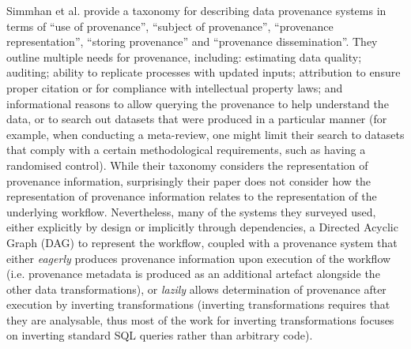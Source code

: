 Simmhan et al. \cite{Simmhan2005} provide a taxonomy for describing data provenance systems in terms of ``use of provenance'', ``subject of provenance'', ``provenance representation'', ``storing provenance'' and ``provenance dissemination''. They outline multiple needs for provenance, including: estimating data quality; auditing; ability to replicate processes with updated inputs; attribution to ensure proper citation or for compliance with intellectual property laws; and informational reasons to allow querying the provenance to help understand the data, or to search out datasets that were produced in a particular manner (for example, when conducting a meta-review, one might limit their search to datasets that comply with a certain methodological requirements, such as having a randomised control). While their taxonomy considers the representation of provenance information, surprisingly their paper does not consider how the representation of provenance information relates to the representation of the underlying workflow. Nevertheless, many of the systems they surveyed used, either explicitly by design or implicitly through dependencies, a Directed Acyclic Graph (DAG) to represent the workflow, coupled with a provenance system that either \textit{eagerly} produces provenance information upon execution of the workflow (i.e. provenance metadata is produced as an additional artefact alongside the other data transformations), or \textit{lazily} allows determination of provenance after execution by inverting transformations (inverting transformations requires that they are analysable, thus most of the work for inverting transformations focuses on inverting standard SQL queries rather than arbitrary code).



